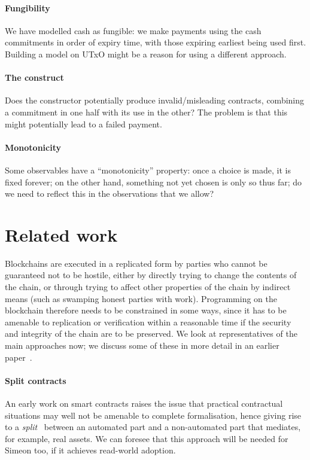 \documentclass[runningheads]{llncs}
\begin{document}
{\paragraph{Fungibility}

We have modelled cash as fungible: we make payments using the cash commitments in order of expiry time, with those 
expiring earliest being used first. Building a model on UTxO might be a reason for using a different approach.


\paragraph{The  construct}

Does the  constructor potentially produce invalid/misleading contracts, combining a commitment in 
one half with its use in the other? The problem is that this might potentially lead to 
a failed payment. 

\paragraph{Monotonicity}

Some observables have a ``monotonicity'' property: once a choice is made, it is fixed forever; on the other hand, 
something not yet chosen is only so thus far; do we need to reflect this in the observations that we allow?

} %

\section{Related work}
\label{sec:related}

Blockchains are executed in a replicated form by parties who cannot be guaranteed not to be hostile, either by directly 
trying to change the contents of the chain, or through trying to affect other properties of the chain by indirect means 
(such as swamping honest parties with work). Programming on the blockchain therefore needs to be constrained in some 
ways, since it has to be amenable to replication or verification within a reasonable time if the security and integrity 
of the chain are to be preserved. We look at representatives of the main approaches now; we discuss some of these in 
more detail in an earlier paper~\cite{cryptoeprint:2016:1156}.

\paragraph{Split contracts}
An early work on smart contracts raises the issue that practical contractual situations may well not be amenable to 
complete formalisation, hence giving rise to a \emph{split}~\cite{split-contracts} between an automated part and a 
non-automated part that mediates, for example, real assets. We can foresee that this approach will be needed for Simeon 
too, if it achieves read-world adoption.
\end{document}
